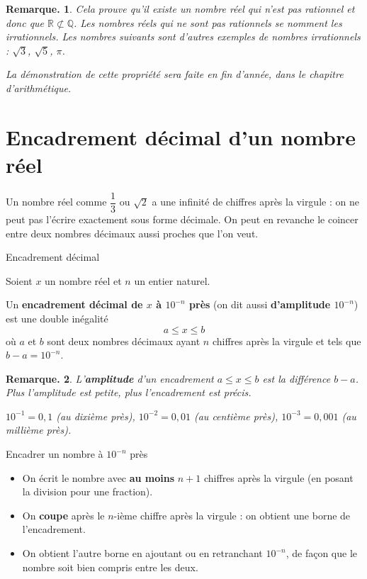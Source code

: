 \documentclass[12pt]{article}
\theoremstyle{break}
\newtheorem*{remark}{Remarque.}
\begin{document}
\begin{remark}
  Cela prouve qu'il existe un nombre réel qui n'est pas rationnel et donc que $\mathbb{R} \not\subset \mathbb{Q}$. Les nombres réels qui ne sont pas rationnels se nomment les \emph{irrationnels}. Les nombres suivants sont d'autres exemples de nombres irrationnels : $\sqrt{3}$, $\sqrt{5}$, $\pi$.

  La démonstration de cette propriété sera faite en fin d'année, dans le chapitre d'arithmétique.
\end{remark}

\section{Encadrement décimal d'un nombre réel}

Un nombre réel comme $\dfrac{1}{3}$ ou $\sqrt{2}$ a une infinité de chiffres après la virgule : on ne peut pas l'écrire exactement sous forme décimale. On peut en revanche le \og coincer \fg{} entre deux nombres décimaux aussi proches que l'on veut.

\begin{definition}{Encadrement décimal}{}
  \begin{multihide}
  Soient $x$ un nombre réel et $n$ un entier naturel.

  Un \textbf{encadrement décimal de $x$ à $10^{-n}$ près} (on dit aussi \textbf{d'amplitude $10^{-n}$}) est une double inégalité
  $$a \leq x \leq b$$
  où $a$ et $b$ sont deux nombres décimaux ayant $n$ chiffres après la virgule et tels que $b - a = 10^{-n}$.
  \end{multihide}
\end{definition}

\begin{remark}
  L'\textbf{amplitude} d'un encadrement $a \leq x \leq b$ est la différence $b - a$. Plus l'amplitude est petite, plus l'encadrement est précis.

  $10^{-1} = 0{,}1$ (au dixième près), $10^{-2} = 0{,}01$ (au centième près), $10^{-3} = 0{,}001$ (au millième près).
\end{remark}

\begin{method}{Encadrer un nombre à $10^{-n}$ près}{}
  \begin{multihide}
  \begin{itemize}
    \item On écrit le nombre avec \textbf{au moins} $n + 1$ chiffres après la virgule (en posant la division pour une fraction).
    \item On \textbf{coupe} après le $n$-ième chiffre après la virgule : on obtient une borne de l'encadrement.
    \item On obtient l'autre borne en ajoutant ou en retranchant $10^{-n}$, de façon que le nombre soit bien compris entre les deux.
  \end{itemize}
  \end{multihide}
\end{method}
\end{document}
